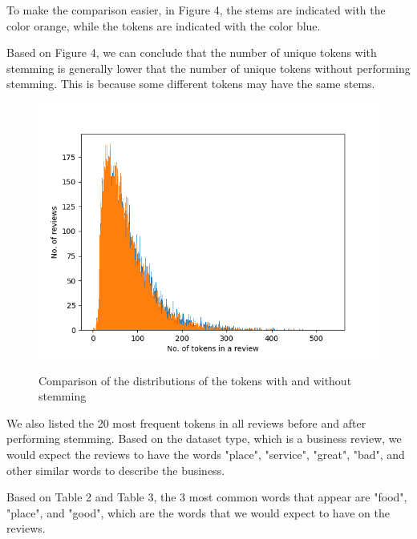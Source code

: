 To make the comparison easier, in Figure 4, the stems are indicated with the color orange, while the tokens are indicated with the color blue.

Based on Figure 4, we can conclude that the number of unique tokens with stemming is generally lower that the number of unique tokens without performing stemming. This is because some different tokens may have the same stems.

\begin{figure}
    \centering
    \caption{Comparison of the distributions of the tokens with and without stemming}
    \includegraphics[scale=0.4]{figures/token_stem_review.png}
    \label{fig:stem_and_token_review}
\end{figure}

We also listed the 20 most frequent tokens in all reviews before and after performing stemming. Based on the dataset type, which is a business review, we would expect the reviews to have the words "place", "service", "great", "bad", and other similar words to describe the business.

Based on Table 2 and Table 3, the 3 most common words that appear are "food", "place", and "good", which are the words that we would expect to have on the reviews.


